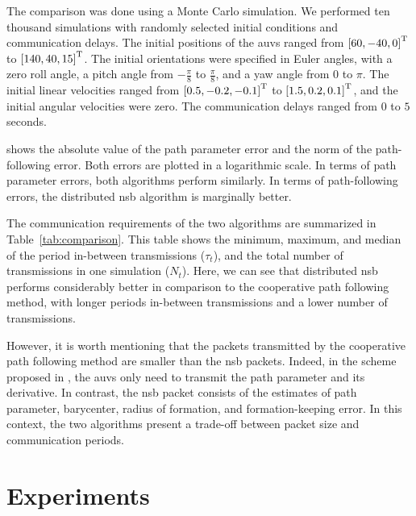 The comparison was done using a Monte Carlo simulation.
We performed ten thousand simulations with randomly selected initial conditions and communication delays.
The initial positions of the \glspl{auv} ranged from $\left[60,-40,0\right]^{\mathrm{T}}$ to $\left[140,40,15\right]^{\mathrm{T}}$.
The initial orientations were specified in Euler angles, with a zero roll angle, a pitch angle from $-\frac{\pi}{8}$ to $\frac{\pi}{8}$, and a yaw angle from $0$ to $\pi$.
The initial linear velocities ranged from $\left[0.5, -0.2, -0.1\right]^{\mathrm{T}}$ to $\left[1.5, 0.2, 0.1\right]^{\mathrm{T}}$, and the initial angular velocities were zero.
The communication delays ranged from $0$ to $5$ seconds.



 shows the absolute value of the path parameter error and the norm of the path-following error.
Both errors are plotted in a logarithmic scale.
In terms of path parameter errors, both algorithms perform similarly.
In terms of path-following errors, the distributed \gls{nsb} algorithm is marginally better.

The communication requirements of the two algorithms are summarized in Table~\ref{tab:comparison}.
This table shows the minimum, maximum, and median of the period in-between transmissions ($\tau_t$), and the total number of transmissions in one simulation ($N_t$).
Here, we can see that distributed \gls{nsb} performs considerably better in comparison to the cooperative path following method, with longer periods in-between transmissions and a lower number of transmissions.

However, it is worth mentioning that the packets transmitted by the cooperative path following method are smaller than the \gls{nsb} packets.
Indeed, in the scheme proposed in \cite{praveen_cooperative_2018}, the \glspl{auv} only need to transmit the path parameter and its derivative.
In contrast, the \gls{nsb} packet consists of the estimates of path parameter, barycenter, radius of formation, and formation-keeping error.
In this context, the two algorithms present a trade-off between packet size and communication periods.



\section{Experiments}
\label{sec:distr_NSB_experiments}


